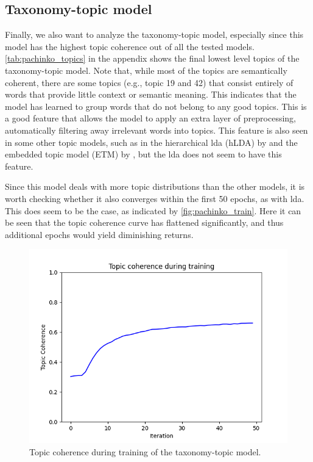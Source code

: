 \subsection{Taxonomy-topic model}\label{sec:taxonomy_analysis}
Finally, we also want to analyze the taxonomy-topic model, especially since this model has the highest topic coherence out of all the tested models.
\autoref{tab:pachinko_topics} in the appendix shows the final lowest level topics of the taxonomy-topic model.
Note that, while most of the topics are semantically coherent, there are some topics (e.g., topic 19 and 42) that consist entirely of words that provide little context or semantic meaning.
This indicates that the model has learned to group words that do not belong to any good topics.
This is a good feature that allows the model to apply an extra layer of preprocessing, automatically filtering away irrelevant words into topics.
This feature is also seen in some other topic models, such as in the hierarchical \gls{lda} (hLDA) by \citet{hLDA2004} and the embedded topic model (ETM) by \citet{dieng2020topic}, but the \gls{lda} does not seem to have this feature.

Since this model deals with more topic distributions than the other models, it is worth checking whether it also converges within the first 50 epochs, as with \gls{lda}.
This does seem to be the case, as indicated by \autoref{fig:pachinko_train}.
Here it can be seen that the topic coherence curve has flattened significantly, and thus additional epochs would yield diminishing returns.

\begin{figure}
	\centering
	\includegraphics[width= \linewidth]{figures/pachinko_training.PNG}
	\caption{Topic coherence during training of the taxonomy-topic model.}
	\label{fig:pachinko_train}
\end{figure}

